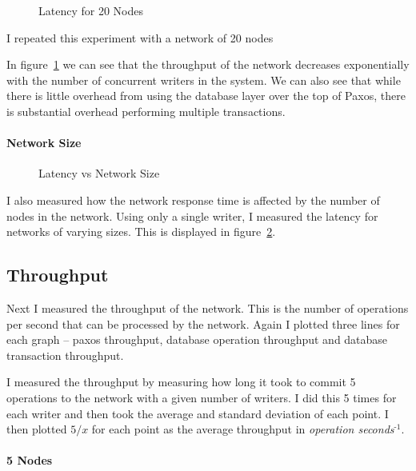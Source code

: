 \documentclass[12pt,twoside,notitlepage]{report}
\newcommand{\lwincludegraphics}[2][]{%
  \sbox{0}{\texttt{[image: \#2]}}%
  \ifdim\wd0>\linewidth
    \resizebox{\linewidth}{!}{\box0 }%
  \else
    \leavevmode\box0
  \fi}
\newcommand{\superscript}[1]{\ensuremath{^{\textrm{#1}}}}
\begin{document}
\begin{figure}[htb]
\centering
\lwincludegraphics[scale=2]{figs/lat_20.eps}
\caption{\label{fig:lat-20}Latency for 20 Nodes}
\end{figure}

I repeated this experiment with a network of 20 nodes


In figure~\ref{fig:lat-20} we can see that the throughput of the network decreases
exponentially with the number of concurrent writers in the system. We can also see that while
there is little overhead from using the database layer over the top of Paxos, there is substantial
overhead performing multiple transactions.

\paragraph{Network Size}

\begin{figure}[htb]
\centering
\lwincludegraphics[scale=2]{figs/lat_rev.eps}
\caption{\label{fig:latency-rev}Latency vs Network Size}
\end{figure}

I also measured how the network response time is affected by the number of nodes in the network.
Using only a single writer, I measured the latency for networks of varying sizes. This is
displayed in figure~\ref{fig:latency-rev}.

\subsection{Throughput}

Next I measured the throughput of the network. This is the number of operations per second that
can be processed by the network. Again I plotted three lines for each graph -- paxos throughput,
database operation throughput and database transaction throughput.

I measured the throughput by measuring how long it took to commit 5 operations to the network with
a given number of writers. I did this 5 times for each writer and then took the average and
standard deviation of each point. I then plotted $5/x$ for each point as the average throughput in
\emph{operation seconds\superscript{-1}}.

\paragraph{5 Nodes}
\end{document}

